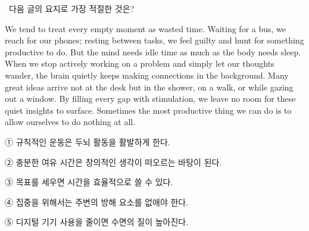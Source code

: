\documentclass[10pt,a4paper,twocolumn]{article}
\newcommand{\probno}[1]{\noindent{\fontsize{12}{14}\selectfont\bfseries #1.}\ }
\newcommand{\instr}[1]{{\sffamily #1}\par\vspace{2pt}}
\begin{document}
\probno{22}\instr{다음 글의 요지로 가장 적절한 것은?}
\par\noindent We tend to treat every empty moment as wasted time. Waiting for a bus, we reach for our phones; resting between tasks, we feel guilty and hunt for something productive to do. But the mind needs idle time as much as the body needs sleep. When we stop actively working on a problem and simply let our thoughts wander, the brain quietly keeps making connections in the background. Many great ideas arrive not at the desk but in the shower, on a walk, or while gazing out a window. By filling every gap with stimulation, we leave no room for these quiet insights to surface. Sometimes the most productive thing we can do is to allow ourselves to do nothing at all.
\begin{choices}
\item ① 규칙적인 운동은 두뇌 활동을 활발하게 한다.
\item ② 충분한 여유 시간은 창의적인 생각이 떠오르는 바탕이 된다.
\item ③ 목표를 세우면 시간을 효율적으로 쓸 수 있다.
\item ④ 집중을 위해서는 주변의 방해 요소를 없애야 한다.
\item ⑤ 디지털 기기 사용을 줄이면 수면의 질이 높아진다.
\end{choices}
\end{document}
